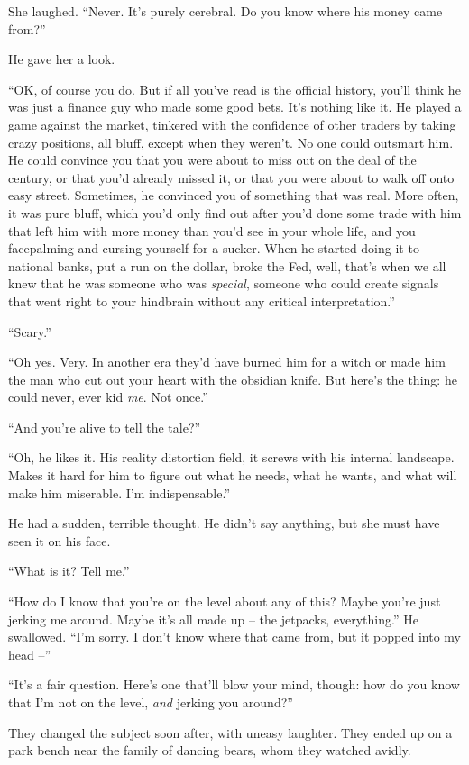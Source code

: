 She laughed. “Never. It's purely cerebral. Do you know where his 
money came from?”

He gave her a look.

“OK, of course you do. But if all you've read is the official 
history, you'll think he was just a finance guy who made some good 
bets. It's nothing like it. He played a game against the market, 
tinkered with the confidence of other traders by taking crazy 
positions, all bluff, except when they weren't. No one could outsmart 
him. He could convince you that you were about to miss out on the deal 
of the century, or that you'd already missed it, or that you were about 
to walk off onto easy street. Sometimes, he convinced you of something 
that was real. More often, it was pure bluff, which you'd only find out 
after you'd done some trade with him that left him with more money than 
you'd see in your whole life, and you facepalming and cursing yourself 
for a sucker. When he started doing it to national banks, put a run on 
the dollar, broke the Fed, well, that's when we all knew that he was 
someone who was \emph{special}, someone who could create signals that 
went right to your hindbrain without any critical interpretation.”

“Scary.”

“Oh yes. Very. In another era they'd have burned him for a witch or 
made him the man who cut out your heart with the obsidian knife. But 
here's the thing: he could never, ever kid \emph{me}. Not once.”

“And you're alive to tell the tale?”

“Oh, he likes it. His reality distortion field, it screws with his 
internal landscape. Makes it hard for him to figure out what he needs, 
what he wants, and what will make him miserable. I'm indispensable.”

He had a sudden, terrible thought. He didn't say anything, but she must 
have seen it on his face.

“What is it? Tell me.”

“How do I know that you're on the level about any of this? Maybe 
you're just jerking me around. Maybe it's all made up -- the jetpacks, 
everything.” He swallowed. “I'm sorry. I don't know where that came 
from, but it popped into my head --”

“It's a fair question. Here's one that'll blow your mind, though: how 
do you know that I'm not on the level, \emph{and} jerking you around?”

They changed the subject soon after, with uneasy laughter. They ended 
up on a park bench near the family of dancing bears, whom they watched 
avidly.

